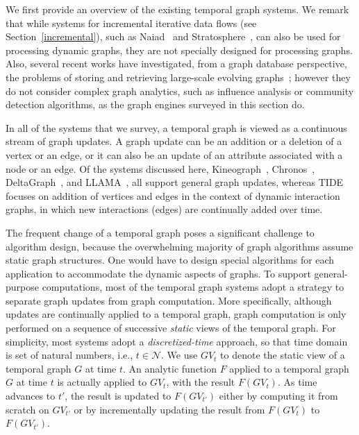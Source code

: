 \documentclass{svjour3}
\begin{document}
We first provide an overview of the existing temporal graph systems. We remark that while systems for incremental iterative data flows (see Section~\ref{incremental}), such as Naiad~\cite{naiad} and Stratosphere~\cite{stratosphere}, can also be used for processing dynamic graphs, they are not specially
designed for processing graphs. Also, several recent works have investigated, from a graph database perspective, the problems of storing and retrieving large-scale evolving graphs~\cite{Mondal2012,RenLKZC11:QueryEvolveGraph}; however they do not consider complex graph analytics, such as influence analysis or community detection algorithms, as the graph engines surveyed in this section do.

\vspace{2mm}

 In all of the systems that we survey, a temporal graph is viewed as a continuous stream of graph updates. A graph update can be an addition or a deletion of a vertex or an edge, or it can also be an update of an attribute associated with a node or an edge. Of the systems discussed here, Kineograph~\cite{kineograph}, Chronos~\cite{chronos}, DeltaGraph~\cite{KhuranaD13:HistoricGraph}, and LLAMA~\cite{llama}, all support general graph updates, whereas TIDE~\cite{tide} focuses on addition of vertices and edges in the context of dynamic interaction graphs, in which new interactions (edges) are continually added over time.

The frequent change of a temporal graph poses a significant challenge to algorithm design, because the overwhelming majority of graph algorithms assume static graph structures. One would have to design special algorithms for each application to accommodate the dynamic aspects of graphs. To support general-purpose computations, most of the temporal graph systems adopt a strategy to separate graph updates from graph computation. More specifically, although updates are continually applied to a temporal graph, graph computation is only performed on a sequence of successive \emph{static} views of the temporal graph. For simplicity, most systems adopt a \emph{discretized-time} approach, so that time domain is set of natural numbers, i.e., $t\in \mathcal{N}$. We use $GV_t$ to denote the static view of a temporal graph $G$ at time $t$. An analytic function $F$ applied to a temporal graph $G$ at time $t$ is actually applied to $GV_t$, with the result $F(GV_{t})$. As time advances to $t'$, the result is updated to $F(GV_{t'})$ either by computing it from scratch on $GV_{t'}$ or by incrementally updating the result from $F(GV_{t})$ to $F(GV_{t'})$.
\end{document}
